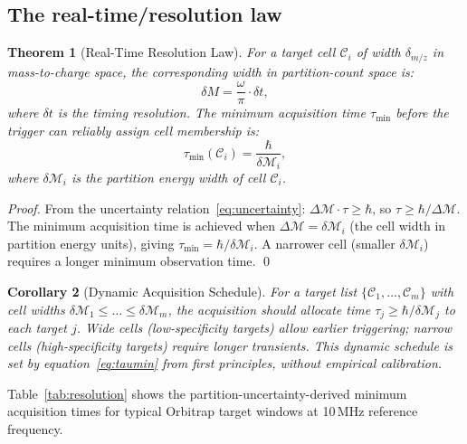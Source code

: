 \documentclass[twocolumn,10pt,a4paper]{article}
\theoremstyle{thmstyle}
\newtheorem{theorem}{Theorem}[section]
\newtheorem{corollary}[theorem]{Corollary}
\theoremstyle{definition}
\theoremstyle{remark}
\newcommand{\calC}{\mathcal{C}}
\newcommand{\Mop}{\mathcal{M}}
\begin{document}
\subsection{The real-time/resolution law}

\begin{theorem}[Real-Time Resolution Law]
\label{thm:resolution-law}
For a target cell $\calC_i$ of width $\delta_{m/z}$ in mass-to-charge
space, the corresponding width in partition-count space is:
\begin{equation}
\delta M = \frac{\omega}{\pi}\cdot\delta t,
\label{eq:dm-dt}
\end{equation}
where $\delta t$ is the timing resolution.
The minimum acquisition time $\tau_{\min}$ before the trigger can
reliably assign cell membership is:
\begin{equation}
\tau_{\min}(\calC_i) = \frac{\hbar}{\delta\Mop_i},
\label{eq:taumin}
\end{equation}
where $\delta\Mop_i$ is the partition energy width of cell $\calC_i$.
\end{theorem}

\begin{proof}
From the uncertainty relation~\eqref{eq:uncertainty}:
$\Delta\Mop \cdot \tau \geq \hbar$, so
$\tau \geq \hbar/\Delta\Mop$. The minimum acquisition time is achieved
when $\Delta\Mop = \delta\Mop_i$ (the cell width in partition energy
units), giving $\tau_{\min} = \hbar/\delta\Mop_i$. A narrower cell
(smaller $\delta\Mop_i$) requires a longer minimum observation time.
\qed
\end{proof}

\begin{corollary}[Dynamic Acquisition Schedule]
\label{cor:dynamic}
For a target list $\{\calC_1, \ldots, \calC_m\}$ with cell widths
$\delta\Mop_1 \leq \ldots \leq \delta\Mop_m$, the acquisition should
allocate time $\tau_j \geq \hbar/\delta\Mop_j$ to each target $j$.
Wide cells (low-specificity targets) allow earlier triggering; narrow
cells (high-specificity targets) require longer transients. This
dynamic schedule is set by equation~\eqref{eq:taumin} from first
principles, without empirical calibration.
\end{corollary}

Table~\ref{tab:resolution} shows the partition-uncertainty-derived minimum
acquisition times for typical Orbitrap target windows at 10\,MHz
reference frequency.
\end{document}
